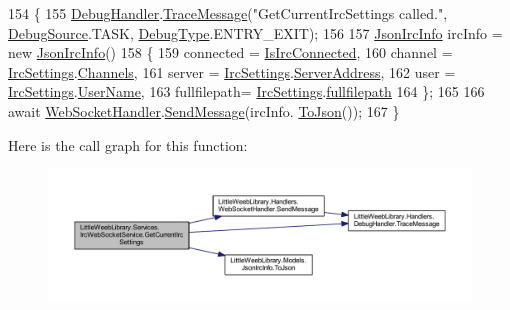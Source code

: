 \begin{DoxyCode}
154         \{
155             \mbox{\hyperlink{class_little_weeb_library_1_1_handlers_1_1_debug_handler}{DebugHandler}}.\mbox{\hyperlink{class_little_weeb_library_1_1_handlers_1_1_debug_handler_afccb37dfd6b2114af72000c2f4fe4607}{TraceMessage}}(\textcolor{stringliteral}{"GetCurrentIrcSettings called."}, 
      \mbox{\hyperlink{namespace_little_weeb_library_1_1_handlers_a2a6ca0775121c9c503d58aa254d292be}{DebugSource}}.TASK, \mbox{\hyperlink{namespace_little_weeb_library_1_1_handlers_ab66019ed40462876ec4e61bb3ccb0a62}{DebugType}}.ENTRY\_EXIT);
156 
157             \mbox{\hyperlink{class_little_weeb_library_1_1_models_1_1_json_irc_info}{JsonIrcInfo}} ircInfo = \textcolor{keyword}{new} \mbox{\hyperlink{class_little_weeb_library_1_1_models_1_1_json_irc_info}{JsonIrcInfo}}()
158             \{
159                 connected = \mbox{\hyperlink{class_little_weeb_library_1_1_services_1_1_irc_web_socket_service_a6621f29728a33aa4be9edbdba319ac9e}{IsIrcConnected}},
160                 channel = \mbox{\hyperlink{class_little_weeb_library_1_1_settings_1_1_irc_settings}{IrcSettings}}.\mbox{\hyperlink{class_little_weeb_library_1_1_settings_1_1_irc_settings_a395d5d33ff9f9699551a38b4ab6866e4}{Channels}},
161                 server = \mbox{\hyperlink{class_little_weeb_library_1_1_settings_1_1_irc_settings}{IrcSettings}}.\mbox{\hyperlink{class_little_weeb_library_1_1_settings_1_1_irc_settings_a99953f00fc76a98af0bd06129876d5ef}{ServerAddress}},
162                 user = \mbox{\hyperlink{class_little_weeb_library_1_1_settings_1_1_irc_settings}{IrcSettings}}.\mbox{\hyperlink{class_little_weeb_library_1_1_settings_1_1_irc_settings_a1a400295f11e155e37002041410e47f1}{UserName}},
163                 fullfilepath= \mbox{\hyperlink{class_little_weeb_library_1_1_settings_1_1_irc_settings}{IrcSettings}}.\mbox{\hyperlink{class_little_weeb_library_1_1_settings_1_1_irc_settings_ad1f67b09e16ba2b5fed2dcdefeac8e1a}{fullfilepath}}
164             \};
165 
166             await \mbox{\hyperlink{class_little_weeb_library_1_1_handlers_1_1_web_socket_handler}{WebSocketHandler}}.\mbox{\hyperlink{class_little_weeb_library_1_1_handlers_1_1_web_socket_handler_a1de289d54d665a32c93478c68d3e6ad0}{SendMessage}}(ircInfo.
      \mbox{\hyperlink{class_little_weeb_library_1_1_models_1_1_json_irc_info_af7d4dd885c7289ca28b0147d4feb2b84}{ToJson}}());
167         \}
\end{DoxyCode}
Here is the call graph for this function\+:\nopagebreak
\begin{figure}[H]
\begin{center}
\leavevmode
\includegraphics[width=350pt]{class_little_weeb_library_1_1_services_1_1_irc_web_socket_service_a9add76a72fff82d5b7009d34620516dd_cgraph}
\end{center}
\end{figure}
